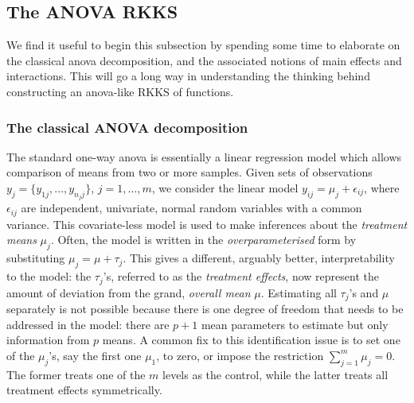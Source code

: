 \subsection{The ANOVA RKKS}
\label{sec:anovarkks}

We find it useful to begin this subsection by spending some time to elaborate on the classical \gls*{anova} decomposition, and the associated notions of main effects and interactions.
This will go a long way in understanding the thinking behind constructing an \gls*{anova}-like RKKS of functions.

\subsubsection{The classical ANOVA decomposition}

The standard one-way \gls*{anova} is essentially a linear regression model which allows comparison of means from two or more samples.
Given sets of observations $y_j = \{y_{1j},\dots,y_{n_jj}\}$, $j=1,\dots,m$, we consider the linear model $y_{ij} = \mu_j + \epsilon_{ij}$, where $\epsilon_{ij}$ are independent, univariate, normal random variables with a common variance.
This covariate-less model is used to make inferences about the  \emph{treatment means} $\mu_j$.
Often, the model is written in the \emph{overparameterised} form by substituting $\mu_j = \mu + \tau_j$.
This gives a different, arguably better, interpretability to the model: the $\tau_j$'s, referred to as the \emph{treatment effects}, now represent the amount of deviation from the grand, \emph{overall mean} $\mu$.
Estimating all $\tau_j$'s and $\mu$ separately is not possible because there is one degree of freedom that needs to be addressed in the model: there are $p+1$ mean parameters to estimate but only information from $p$ means.
A common fix to this identification issue is to set one of the $\mu_j$'s, say the first one $\mu_1$, to zero, or impose the restriction $\sum_{j=1}^m \mu_j = 0$.
The former treats one of the $m$ levels as the control, while the latter treats all treatment effects symmetrically.

